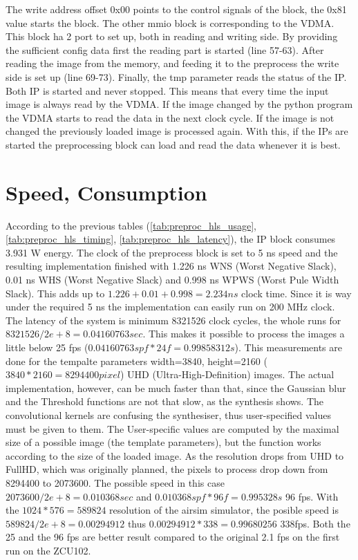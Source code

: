 The write address offset 0x00 points to the control signals of the block, the 0x81 value starts the block.
The other mmio block is corresponding to the VDMA.
This block ha 2 port to set up, both in reading and writing side.
By providing the sufficient config data first the reading part is started (line 57-63).
After reading the image from the memory, and feeding it to the preprocess the write side is set up (line 69-73).
Finally, the tmp parameter reads the status of the IP.
Both IP is started and never stopped.
This means that every time the input image is always read by the VDMA.
If the image changed by the python program the VDMA starts to read the data in the next clock cycle.
If the image is not changed the previously loaded image is processed again.
With this, if the IPs are started the preprocessing block can load and read the data whenever it is best.

\section{Speed, Consumption} %

According to the previous tables (\cref{tab:preproc_hls_usage}, \cref{tab:preproc_hls_timing}, \cref{tab:preproc_hls_latency}), the IP block consumes 3.931 W energy.
The clock of the preprocess block is set to 5 ns speed and the resulting implementation finished with 1.226 ns WNS (Worst Negative Slack), 0.01 ns WHS (Worst Negative Slack) and 0.998 ns WPWS (Worst Pule Width Slack).
This adds up to $1.226 + 0.01 + 0.998 = 2.234 ns$ clock time.
Since it is way under the required 5 ns the implementation can easily run on 200 MHz clock.
The latency of the system is minimum 8321526 clock cycles, the whole runs for $8321526 / 2e+8 = 0.04160763 sec$.
This makes it possible to process the images a little below 25 fps ($0.04160763 spf * 24 f = 0.99858312 s$).
This measurements are done for the tempalte parameters width=3840, height=2160 ($3840 * 2160 = 8294400 pixel$) UHD (Ultra-High-Definition) images.
The actual implementation, however, can be much faster than that, since the Gaussian blur and the Threshold functions are not that slow, as the synthesis shows.
The convolutional kernels are confusing the synthesiser, thus user-specified values must be given to them.
The User-specific values are computed by the maximal size of a possible image (the template parameters), but the function works according to the size of the loaded image.
As the resolution drops from UHD to FullHD, which was originally planned, the pixels to process drop down from 8294400 to 2073600.
The possible speed in this case $2073600 / 2e+8 = 0.010368 sec$ and $0.010368 spf * 96 f = 0.995328 s$ 96 fps.
With the $1024*576=589824$ resolution of the airsim simulator, the posible speed is $589824/ 2e+8 = 0.00294912$ thus  $0.00294912 * 338 = 0.99680256$ 338fps.
Both the 25 and the 96 fps are better result compared to the original 2.1 fps on the first run on the ZCU102.

\clearpage %